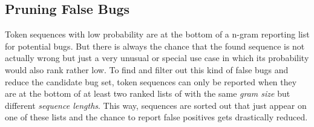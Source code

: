 \subsection{Pruning False Bugs}\label{subsec:false_bugs}
Token sequences with low probability are at the bottom of a n-gram reporting list for potential bugs. But there is always the chance that the found sequence is not actually wrong but just a very unusual or special use case in which its probability would also rank rather low. To find and filter out this kind of false bugs and reduce the candidate bug set, token sequences can only be reported when they are at the bottom of at least two ranked lists of  with the same \textit{gram size} but different \textit{sequence lengths}. This way, sequences are sorted out that just appear on one of these lists and the chance to report false positives gets drastically reduced. 